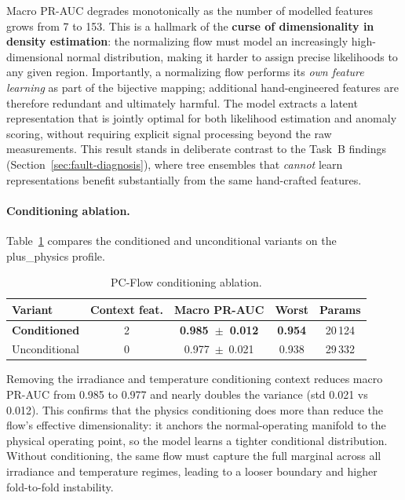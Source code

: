 Macro PR-AUC degrades monotonically as the number of modelled features grows from 7 to 153. This is a hallmark of the \textbf{curse of dimensionality in density estimation}: the normalizing flow must model an increasingly high-dimensional normal distribution, making it harder to assign precise likelihoods to any given region. Importantly, a normalizing flow performs its \emph{own feature learning} as part of the bijective mapping; additional hand-engineered features are therefore redundant and ultimately harmful. The model extracts a latent representation that is jointly optimal for both likelihood estimation and anomaly scoring, without requiring explicit signal processing beyond the raw measurements. This result stands in deliberate contrast to the Task~B findings (Section~\ref{sec:fault-diagnosis}), where tree ensembles that \emph{cannot} learn representations benefit substantially from the same hand-crafted features.
\paragraph{Conditioning ablation.}
Table~\ref{tab:pcflow-cond-abl} compares the conditioned and unconditional variants on the plus\_physics profile.
\begin{table}[H]
\centering
\caption{PC-Flow conditioning ablation.\label{tab:pcflow-cond-abl}}
\begin{tabular}{lcccc}
\toprule
\textbf{Variant} & \textbf{Context feat.} & \textbf{Macro PR-AUC} & \textbf{Worst} & \textbf{Params} \\
\midrule
\textbf{Conditioned} & 2 & \textbf{0.985~$\pm$~0.012} & \textbf{0.954} & 20\,124 \\
Unconditional                   & 0 & 0.977~$\pm$~0.021          & 0.938          & 29\,332 \\
\bottomrule
\end{tabular}
\end{table}

Removing the irradiance and temperature conditioning context reduces macro PR-AUC from 0.985 to 0.977 and nearly doubles the variance (std 0.021 vs 0.012). This confirms that the physics conditioning does more than reduce the flow's effective dimensionality: it anchors the normal-operating manifold to the physical operating point, so the model learns a tighter conditional distribution. Without conditioning, the same flow must capture the full marginal across all irradiance and temperature regimes, leading to a looser boundary and higher fold-to-fold instability.

